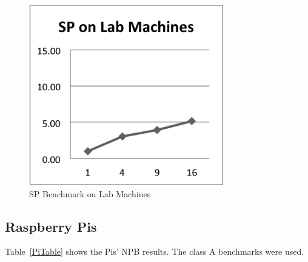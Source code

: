 \documentclass{acm_proc_article-sp}
\begin{document}
\begin{figure}[tbp]
  \centering
  \caption{SP Benchmark on Lab Machines}
	\label{LabSP}
  \includegraphics[width=20pc]{Pics-Lab/SP.png}
\end{figure}

\clearpage

\subsection{Raspberry Pis}

Table~\ref{PiTable} shows the Pis' NPB results. The class A benchmarks were used.
\end{document}
